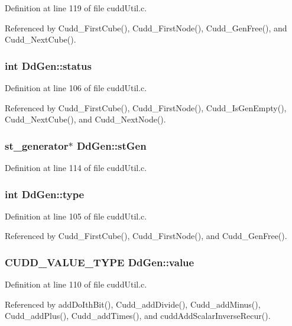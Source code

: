 Definition at line 119 of file cudd\-Util.c.

Referenced by Cudd\_\-First\-Cube(), Cudd\_\-First\-Node(), Cudd\_\-Gen\-Free(), and Cudd\_\-Next\-Cube().
\subsubsection{\setlength{\rightskip}{0pt plus 5cm}int \bf{Dd\-Gen::status}}\label{structDdGen_2a0b06cb6f9907bf1d750cfe2b30d1f0}




Definition at line 106 of file cudd\-Util.c.

Referenced by Cudd\_\-First\-Cube(), Cudd\_\-First\-Node(), Cudd\_\-Is\-Gen\-Empty(), Cudd\_\-Next\-Cube(), and Cudd\_\-Next\-Node().
\subsubsection{\setlength{\rightskip}{0pt plus 5cm}\bf{st\_\-generator}$\ast$ \bf{Dd\-Gen::st\-Gen}}\label{structDdGen_09e3f60de6e458365a8ecabcf7d0d375}




Definition at line 114 of file cudd\-Util.c.
\subsubsection{\setlength{\rightskip}{0pt plus 5cm}int \bf{Dd\-Gen::type}}\label{structDdGen_b08569c7ba12c63288a09a92109aa81d}




Definition at line 105 of file cudd\-Util.c.

Referenced by Cudd\_\-First\-Cube(), Cudd\_\-First\-Node(), and Cudd\_\-Gen\-Free().
\subsubsection{\setlength{\rightskip}{0pt plus 5cm}CUDD\_\-VALUE\_\-TYPE \bf{Dd\-Gen::value}}\label{structDdGen_ce0cb69e960420e07582b760bb7a648b}




Definition at line 110 of file cudd\-Util.c.

Referenced by add\-Do\-Ith\-Bit(), Cudd\_\-add\-Divide(), Cudd\_\-add\-Minus(), Cudd\_\-add\-Plus(), Cudd\_\-add\-Times(), and cudd\-Add\-Scalar\-Inverse\-Recur().
